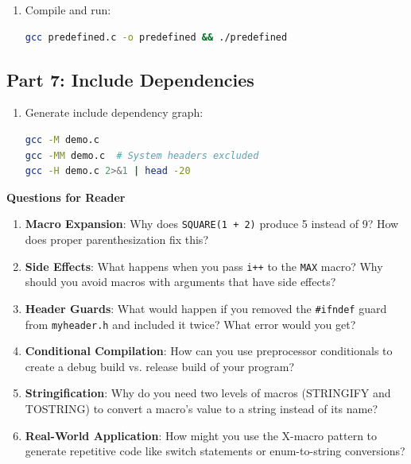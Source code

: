 \begin{experiment}
\begin{enumerate}
    \item Compile and run:

\begin{lstlisting}[language=bash]
gcc predefined.c -o predefined && ./predefined
\end{lstlisting}
\end{enumerate}

\subsection{Part 7: Include Dependencies}

\begin{enumerate}
    \item Generate include dependency graph:

\begin{lstlisting}[language=bash]
gcc -M demo.c
gcc -MM demo.c  # System headers excluded
gcc -H demo.c 2>&1 | head -20
\end{lstlisting}
\end{enumerate}

\textbf{Questions for Reader}

\begin{enumerate}
    \item \textbf{Macro Expansion}: Why does \texttt{SQUARE(1 + 2)} produce 5 instead of 9? How does proper parenthesization fix this?

    \item \textbf{Side Effects}: What happens when you pass \texttt{i++} to the \texttt{MAX} macro? Why should you avoid macros with arguments that have side effects?

    \item \textbf{Header Guards}: What would happen if you removed the \texttt{\#ifndef} guard from \texttt{myheader.h} and included it twice? What error would you get?

    \item \textbf{Conditional Compilation}: How can you use preprocessor conditionals to create a debug build vs. release build of your program?

    \item \textbf{Stringification}: Why do you need two levels of macros (STRINGIFY and TOSTRING) to convert a macro's value to a string instead of its name?

    \item \textbf{Real-World Application}: How might you use the X-macro pattern to generate repetitive code like switch statements or enum-to-string conversions?
\end{enumerate}


\end{experiment}
